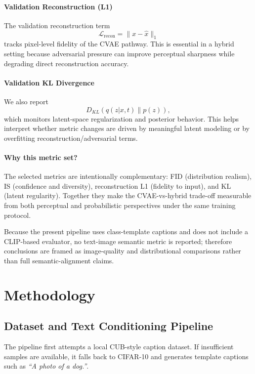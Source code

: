\documentclass[11pt]{article}
\begin{document}
\paragraph{Validation Reconstruction (L1)}
The validation reconstruction term
\[
\mathcal{L}_{\mathrm{recon}} = \|x-\hat{x}\|_1
\]
tracks pixel-level fidelity of the CVAE pathway. This is essential in a hybrid setting because adversarial pressure can improve perceptual sharpness while degrading direct reconstruction accuracy.

\paragraph{Validation KL Divergence}
We also report
\[
D_{KL}(q(z|x,t)\|p(z)),
\]
which monitors latent-space regularization and posterior behavior. This helps interpret whether metric changes are driven by meaningful latent modeling or by overfitting reconstruction/adversarial terms.

\paragraph{Why this metric set?}
The selected metrics are intentionally complementary: FID (distribution realism), IS (confidence and diversity), reconstruction L1 (fidelity to input), and KL (latent regularity). Together they make the CVAE-vs-hybrid trade-off measurable from both perceptual and probabilistic perspectives under the same training protocol.

Because the present pipeline uses class-template captions and does not include a CLIP-based evaluator, no text-image semantic metric is reported; therefore conclusions are framed as image-quality and distributional comparisons rather than full semantic-alignment claims.

\section{Methodology}

\subsection{Dataset and Text Conditioning Pipeline}

The pipeline first attempts a local CUB-style caption dataset. If insufficient samples are available, it falls back to CIFAR-10 and generates template captions such as \textit{``A photo of a dog.''}.
\end{document}
